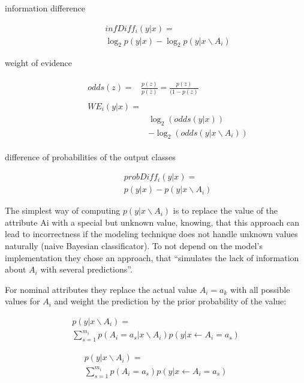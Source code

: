 \begin{description}
    \item[information difference]
        \begin{multline}
              infDiff_{i}(y|x) = \\
              \log_{2} p(y|x)−\log_{2} p(y|x \backslash A_{i})
        \end{multline}
          
    \item[weight of evidence ]
        \begin{align}
            \begin{split}
                odds(z) ={}& \frac{p(z)}{p(\bar{z})} = \frac{p(z)}{(1 − p(z)}
            \end{split}\\
            \begin{split}
                WE_{i}(y|x) ={}& \\
                & \log_{2} (odds(y|x)) \\
                & - \log_{2}(odds(y|x \backslash A_{i}))    
            \end{split}
        \end{align}
       
    \item[difference of probabilities of the output classes]
        \begin{multline}
            probDiff_{i} (y|x) = \\
        p(y|x)− p(y|x \backslash A_{i})
        \end{multline}
\end{description}
\par
The simplest way of computing \(p(y|x \backslash A_{i})\) is to replace the value of the attribute Ai with a special but unknown value, knowing, that this approach can lead to incorrectness if the modeling technique does not handle unknown values naturally (naive Bayesian classificator).
To not depend on the model's implementation they chose an approach, that “simulates the lack of information about \(A_{i}\) with several predictions”\cite[p.4]{RobnikSikonja.2008}.
\par
For  nominal attributes they replace the actual value \(A_{i} = a_{k}\) with all possible values for \(A_{i}\) and weight the prediction by the prior probability of the value: 
\begin{description}

    \item 
        \begin{multline} 
            p(y|x \backslash A_{i}) = \\ 
            \sum_{s=1}^{m_{i}} p(A_{i} = a_{s} | x \backslash A_{i})p(y|x ← A_{i} = a_{s})
        \end{multline}
    \item 
        \begin{multline}
            p(y|x \backslash A_{i}) = \\ 
            \sum_{s=1}^{m_{i}} p(A_{i} = a_{s})p(y|x ← A_{i} = a_{s})
        \end{multline}
\end{description}


